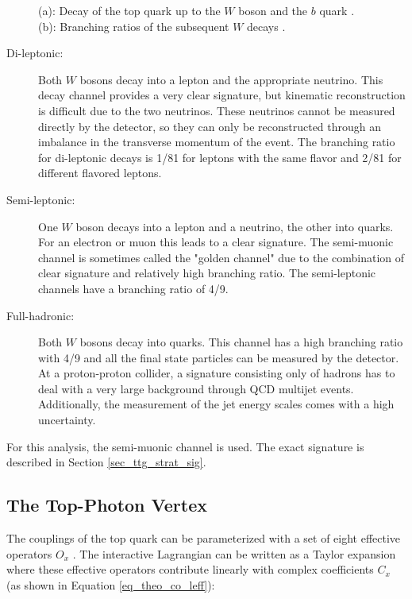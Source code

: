 \begin{figure}[ht]
  \caption{(a): Decay of the top quark up to the $W$ boson and the $b$ quark \cite{tholen:ma}. (b): Branching ratios of the subsequent $W$ decays \cite{top_branch}. }
  \label{fig_theo_top_decay}
\end{figure}

\begin{description}
\item[Di-leptonic:] Both $W$ bosons decay into a lepton and the appropriate neutrino. This decay channel provides a very clear signature, but kinematic reconstruction is difficult due to the two neutrinos. These neutrinos cannot be measured directly by the detector, so they can only be reconstructed through an imbalance in the transverse momentum of the event. The branching ratio for di-leptonic decays is 1/81 for leptons with the same flavor and 2/81 for different flavored leptons.
\newpage
\item[Semi-leptonic:] One $W$ boson decays into a lepton and a neutrino, the other into quarks. For an electron or muon this leads to a clear signature. The semi-muonic channel is sometimes called the "golden channel" due to the combination of clear signature and relatively high branching ratio. The semi-leptonic channels have a branching ratio of 4/9.
\item[Full-hadronic:] Both $W$ bosons decay into quarks. This channel has a high branching ratio with 4/9 and all the final state particles can be measured by the detector. At a proton-proton collider, a signature consisting only of hadrons has to deal with a very large background through QCD multijet events. Additionally, the measurement of the jet energy scales comes with a high uncertainty.
\end{description}

For this analysis, the semi-muonic channel is used. The exact signature is described in Section \ref{sec_ttg_strat_sig}.

\subsection{The Top-Photon Vertex}
\label{sec_theo_tgv}

The couplings of the top quark can be parameterized with a set of eight effective operators $O_x$ \cite{AguilarSaavedra:2008zc}. The interactive Lagrangian can be written as a Taylor expansion where these effective operators contribute linearly with complex coefficients $C_x$ (as shown in Equation \ref{eq_theo_co_leff}):

